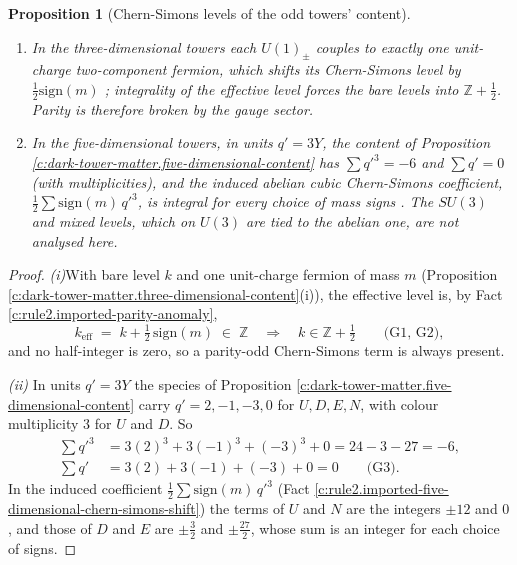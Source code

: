 \documentclass[11pt]{article}
\newtheorem{proposition}[theorem]{Proposition}
\theoremstyle{definition}
\theoremstyle{plain}
\newcommand{\changedmark}[2]{\marginpar{\raggedright\scriptsize\color{#1}#2}}
\begin{document}
\begin{proposition}[Chern-Simons levels of the odd towers' content]\label{c:dark-tower-matter.anomalies}
\changedmark{BurntOrange}{changed since the deposit}
\begin{enumerate}
\item[(i)] In the three-dimensional towers each $U(1)_{\pm}$ couples to exactly one unit-charge two-component fermion, which shifts its Chern-Simons level by $\tfrac{1}{2}\mathrm{sign}(m)$ \cite{Redlich1984}; integrality of the effective level forces the bare levels into $\mathbb{Z} + \tfrac{1}{2}$. Parity is therefore broken by the gauge sector.
\item[(ii)] In the five-dimensional towers, in units $q' = 3Y$, the content of Proposition \ref{c:dark-tower-matter.five-dimensional-content} has $\sum q'^{3} = -6$ and $\sum q' = 0$ (with multiplicities), and the induced abelian cubic Chern-Simons coefficient, $\tfrac{1}{2}\sum \mathrm{sign}(m)\,q'^{3}$, is integral for every choice of mass signs \cite{IMS1997}. The $SU(3)$ and mixed levels, which on $U(3)$ are tied to the abelian one, are not analysed here.
\end{enumerate}
\end{proposition}
\begin{proof}
\textit{(i)}\enspace With bare level $k$ and one unit-charge fermion of mass $m$ (Proposition \ref{c:dark-tower-matter.three-dimensional-content}(i)), the effective level is, by Fact \ref{c:rule2.imported-parity-anomaly},
\[
k_{\mathrm{eff}} \;=\; k + \tfrac{1}{2}\,\mathrm{sign}(m) \;\in\; \mathbb{Z} \quad\Longrightarrow\quad k \in \mathbb{Z} + \tfrac{1}{2} \qquad \text{(G1, G2)},
\]
and no half-integer is zero, so a parity-odd Chern-Simons term is always present.



\emph{(ii)}  In units $q' = 3Y$ the species of Proposition \ref{c:dark-tower-matter.five-dimensional-content} carry $q' = 2, -1, -3, 0$ for $U, D, E, N$, with colour multiplicity $3$ for $U$ and $D$. So
\begin{align*}
\sum q'^{3} &= 3(2)^{3} + 3(-1)^{3} + (-3)^{3} + 0 = 24 - 3 - 27 = -6, \\
\sum q' &= 3(2) + 3(-1) + (-3) + 0 = 0 \qquad \text{(G3)}.
\end{align*}
In the induced coefficient $\tfrac{1}{2}\sum \mathrm{sign}(m)\,q'^{3}$ (Fact \ref{c:rule2.imported-five-dimensional-chern-simons-shift}) the terms of $U$ and $N$ are the integers $\pm 12$ and $0$, and those of $D$ and $E$ are $\pm\tfrac{3}{2}$ and $\pm\tfrac{27}{2}$, whose sum is an integer for each choice of signs.

\end{proof}
\end{document}
